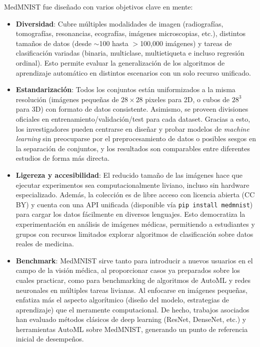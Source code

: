\documentclass[11pt,spanish,listoffigures,listoftables]{tfgetsinf}
\begin{document}
MedMNIST  fue diseñado con varios objetivos clave en mente:
\begin{itemize}
    \item \textbf{Diversidad}: Cubre múltiples modalidades de imagen (radiografías, tomografías, resonancias, ecografías, 
    imágenes microscopias, etc.), distintos tamaños de datos (desde $\sim$100 hasta $>$100,000 imágenes) y tareas de 
    clasificación variadas (binaria, multiclase, multietiqueta e incluso regresión ordinal). Esto permite evaluar la generalización 
    de los algoritmos de aprendizaje automático en distintos escenarios con un solo recurso unificado.
    
    \item \textbf{Estandarización}: Todos los conjuntos están uniformizados a la misma resolución (imágenes pequeñas de $28\times28$ 
    pixeles para 2D, o cubos de $28^3$ para 3D) con formato de datos consistente. Asimismo, se proveen divisiones oficiales en 
    entrenamiento/validación/test para cada dataset. Gracias a esto, los investigadores pueden centrarse en diseñar y probar 
    modelos de \textit{machine learning} sin preocuparse por el preprocesamiento de datos o posibles sesgos en la separación 
    de conjuntos, y los resultados son comparables entre diferentes estudios de forma más directa.
    
    \item \textbf{Ligereza y accesibilidad}:  El reducido tamaño de las imágenes hace que ejecutar experimentos sea computacionalmente 
    liviano, incluso sin hardware especializado. Además, la colección es de libre acceso con licencia abierta (CC BY) y cuenta con una 
    API unificada (disponible vía \texttt{pip install medmnist}) para cargar los datos fácilmente en diversos lenguajes. 
    Esto democratiza la experimentación en análisis de imágenes médicas, permitiendo a estudiantes y grupos con recursos limitados 
    explorar algoritmos de clasificación sobre datos reales de medicina.

    \item \textbf{Benchmark}: MedMNIST sirve tanto para introducir a nuevos usuarios en el campo de la visión médica, al 
    proporcionar casos ya preparados sobre los cuales practicar, como para benchmarking de algoritmos de AutoML y redes 
    neuronales en múltiples tareas livianas. Al enfocarse en imágenes pequeñas, enfatiza más el aspecto algorítmico 
    (diseño del modelo, estrategias de aprendizaje) que el meramente computacional. De hecho, trabajos asociados han 
    evaluado métodos clásicos de deep learning (ResNet, DenseNet, etc.) y herramientas AutoML sobre MedMNIST, generando 
    un punto de referencia inicial de desempeños.
\end{itemize}
\end{document}
